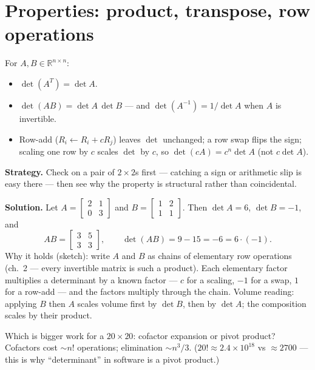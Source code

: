 \section{Properties: product, transpose, row operations}\label{sec:det-props}

\begin{theorem}\label{th:detprops}
For $A,B\in\mathbb R^{n\times n}$:
\begin{itemize}
\item $\det(A^{T})=\det A$.
\item $\det(AB)=\det A\,\det B$ --- and $\det(A^{-1})=1/\det A$ when $A$ is
invertible.
\item Row-add ($R_i\leftarrow R_i+cR_j$) leaves $\det$ unchanged; a row
swap flips the sign; scaling one row by $c$ scales $\det$ by $c$, so
$\det(cA)=c^{n}\det A$ (not $c\det A$).
\end{itemize}
\end{theorem}

\begin{example}\label{ex:detprod}
\textbf{Strategy.} Check on a pair of $2\times2$s first --- catching a sign
or arithmetic slip is easy there --- then see why the property is
structural rather than coincidental.

\textbf{Solution.} Let $A=\begin{bmatrix}2&1\\0&3\end{bmatrix}$ and
$B=\begin{bmatrix}1&2\\1&1\end{bmatrix}$. Then $\det A=6$, $\det B=-1$,
and
\[
AB=\begin{bmatrix}3&5\\3&3\end{bmatrix},
\qquad \det(AB)=9-15=-6=6\cdot(-1) .
\]
Why it holds (sketch): write $A$ and $B$ as chains of elementary row
operations (ch.~2 --- every invertible matrix is such a product). Each
elementary factor multiplies a determinant by a known factor --- $c$ for a
scaling, $-1$ for a swap, $1$ for a row-add --- and the factors multiply
through the chain. Volume reading: applying $B$ then $A$ scales volume
first by $\det B$, then by $\det A$; the composition scales by their
product.
\end{example}

\begin{checkpoint}
Which is bigger work for a $20\times20$: cofactor expansion or pivot
product? Cofactors cost $\sim n!$ operations; elimination $\sim n^3/3$.
($20!\approx2.4\times10^{18}$ vs $\approx2700$ --- this is why
``determinant'' in software is a pivot product.)
\end{checkpoint}

